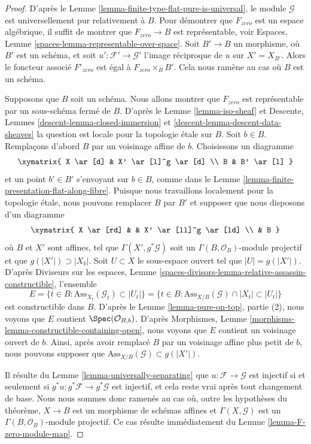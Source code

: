 \begin{proof}
D'après le Lemme \ref{lemma-finite-type-flat-pure-is-universal},
le module $\mathcal{G}$ est universellement pur relativement à $B$.
Pour démontrer que $F_{zero}$ est un espace algébrique,
il suffit de montrer que $F_{zero} \to B$ est représentable, voir
Espaces, Lemme \ref{spaces-lemma-representable-over-space}.
Soit $B' \to B$ un morphisme, où $B'$ est un schéma, et soit
$u' : \mathcal{F}' \to \mathcal{G}'$ l'image réciproque de $u$ sur $X' = X_{B'}$.
Alors le foncteur associé $F'_{zero}$ est égal à $F_{zero} \times_B B'$.
Cela nous ramène au cas où $B$ est un schéma.

\medskip\noindent
Supposons que $B$ soit un schéma. Nous allons montrer que $F_{zero}$ est représentable
par un sous-schéma fermé de $B$. D'après le Lemme \ref{lemma-iso-sheaf} et
Descente, Lemmes \ref{descent-lemma-closed-immersion} et
\ref{descent-lemma-descent-data-sheaves}
la question est locale pour la topologie \'etale sur $B$. Soit $b \in B$.
Remplaçons d'abord $B$ par un voisinage affine de $b$.
Choisissons un diagramme
$$
\xymatrix{
X \ar[d] & X' \ar[l]^g \ar[d] \\
B & B' \ar[l]
}
$$
et un point $b' \in B'$ s'envoyant sur $b \in B$,
comme dans le Lemme \ref{lemma-finite-presentation-flat-along-fibre}.
Puisque nous travaillons localement pour la topologie \'etale, nous pouvons remplacer
$B$ par $B'$ et supposer que nous disposons d'un diagramme
$$
\xymatrix{
X \ar[rd] & & X' \ar[ll]^g \ar[ld] \\
& B
}
$$
où $B$ et $X'$ sont affines, tel que $\Gamma(X', g^*\mathcal{G})$
soit un $\Gamma(B, \mathcal{O}_B)$-module projectif et que
$g(|X'|) \supset |X_b|$. Soit $U \subset X$ le sous-espace ouvert
tel que $|U| = g(|X'|)$. D'après
Diviseurs sur les espaces, Lemme
\ref{spaces-divisors-lemma-relative-assassin-constructible}, l'ensemble
$$
E = \{t \in B : \text{Ass}_{X_t}(\mathcal{G}_t) \subset |U_t|\} =
\{t \in B : \text{Ass}_{X/B}(\mathcal{G}) \cap |X_t| \subset |U_t|\}
$$
est constructible dans $B$. D'après le Lemme \ref{lemma-pure-on-top}, partie (2),
nous voyons que $E$ contient $\Spec(\mathcal{O}_{B, b})$. D'après
Morphismes, Lemme \ref{morphisms-lemma-constructible-containing-open},
nous voyons que $E$ contient un voisinage ouvert de $b$. Ainsi, après avoir
remplacé $B$ par un voisinage affine plus petit de $b$, nous pouvons supposer que
$\text{Ass}_{X/B}(\mathcal{G}) \subset g(|X'|)$.

\medskip\noindent
Il résulte du Lemme \ref{lemma-universally-separating}
que $u : \mathcal{F} \to \mathcal{G}$ est injectif si et seulement si
$g^*u : g^*\mathcal{F} \to g^*\mathcal{G}$ est injectif, et cela reste
vrai après tout changement de base. Nous nous sommes donc ramenés au cas où,
outre les hypothèses du théorème, $X \to B$ est un morphisme de
schémas affines et $\Gamma(X, \mathcal{G})$ est un
$\Gamma(B, \mathcal{O}_B)$-module projectif. Ce cas résulte immédiatement du
Lemme \ref{lemma-F-zero-module-map}.


\end{proof}
